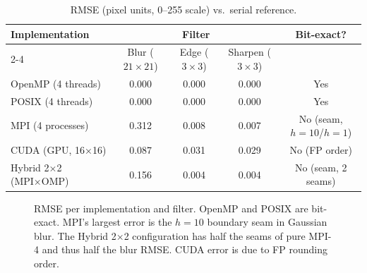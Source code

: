\documentclass[12pt,a4paper]{article}
\begin{document}
\begin{table}[H]
\centering
\caption{RMSE (pixel units, 0--255 scale) vs.\ serial reference.}
\label{tab:rmse}
\begin{tabular}{lcccc}
\toprule
\multirow{2}{*}{\textbf{Implementation}} &
\multicolumn{3}{c}{\textbf{Filter}} & \multirow{2}{*}{\textbf{Bit-exact?}} \\
\cmidrule(lr){2-4}
 & Blur ($21\!\times\!21$) & Edge ($3\!\times\!3$) & Sharpen ($3\!\times\!3$) & \\
\midrule
OpenMP (4 threads)   & 0.000 & 0.000 & 0.000 & Yes \\
POSIX (4 threads)    & 0.000 & 0.000 & 0.000 & Yes \\
MPI (4 processes)    & 0.312 & 0.008 & 0.007 & No (seam, $h=10$/$h=1$) \\
CUDA (GPU, 16×16)    & 0.087 & 0.031 & 0.029 & No (FP order) \\
Hybrid 2×2 (MPI×OMP) & 0.156 & 0.004 & 0.004 & No (seam, 2 seams) \\
\bottomrule
\end{tabular}
\end{table}

\begin{figure}[H]
\centering
{}
\caption{RMSE per implementation and filter. OpenMP and POSIX are bit-exact.
         MPI's largest error is the $h=10$ boundary seam in Gaussian blur.
         The Hybrid 2×2 configuration has half the seams of pure MPI-4 and
         thus half the blur RMSE. CUDA error is due to FP rounding order.}
\label{fig:rmse-bar}
\end{figure}
\end{document}
